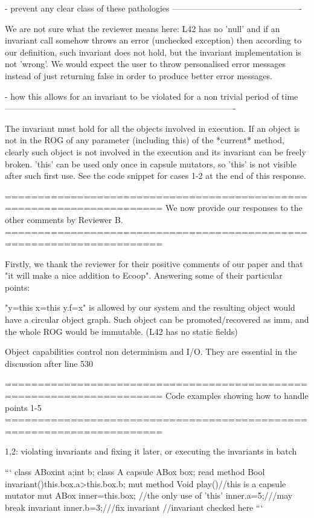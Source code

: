 - prevent any clear class of these pathologies
----------------------------------------------

We are not sure what the reviewer means here: L42 has no 'null' and if an invariant call
somehow throws an error (unchecked exception) then according to our definition,
such invariant does not hold, but the invariant implementation is not 'wrong'.
We would expect the user to throw personalised error messages instead of just returning false
in order to produce better error messages.

- how this allows for an invariant to be violated for a non trivial period of time
----------------------------------------------------------------------------------

The invariant must hold for all the objects involved in execution.
If an object is not in the ROG of any parameter (including this) of the *current* method,
clearly such object is not involved in the execution and its invariant can be freely broken.
'this' can be used only once in capsule mutators, so 'this' is not visible after such first use.
See the code snippet for cases 1-2 at the end of this response.


======================================================================
We now provide our responses to the other comments by Reviewer B.
======================================================================

Firstly, we thank the reviewer for their positive comments of our paper and that "it will make a nice addition to Ecoop".
Answering some of their particular points: 

"y=this x=this y.f=x" is allowed by our system and the resulting object would have a circular object graph.
Such object can be promoted/recovered as imm, and the whole ROG would be immutable.
(L42 has no static fields)

Object capabilities control non determinism and I/O. They are essential in the discussion after line 530


======================================================================
Code examples showing how to handle points 1-5
======================================================================

1,2: violating invariants and fixing it later, or executing the invariants in batch

```
  class ABox{int a;int b;}
  class A{
    capsule ABox box;
    read method Bool invariant(){this.box.a>this.box.b;}
    mut method Void play(){//this is a capsule mutator
      mut ABox inner=this.box; //the only use of 'this'
      inner.a=5;///may break invariant
      inner.b=3;///fix invariant
      //invariant checked here
    }
  }
```

